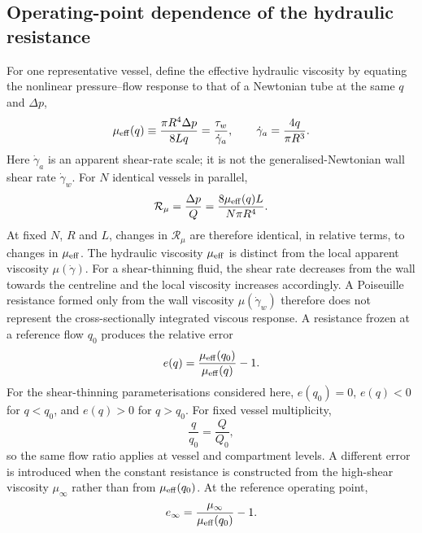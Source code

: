 \documentclass[lineno]{jfm}
\begin{document}
\subsection{Operating-point dependence of the hydraulic resistance}
\label{sec:calibration-point}
For one representative vessel, define the effective hydraulic viscosity by
equating the nonlinear pressure--flow response to that of a Newtonian tube at
the same $q$ and $\Delta p$,
\begin{equation}
\mu_{\rm eff}(q)
\equiv
\frac{\pi R^4\Delta p}{8Lq}
=
\frac{\tau_w}{\dot{\gamma}_a},
\qquad
\dot{\gamma}_a
=
\frac{4q}{\pi R^3}.
\label{eq:mu-eff}
\end{equation}
Here $\dot{\gamma}_a$ is an apparent shear-rate scale; it is not the
generalised-Newtonian wall shear rate $\dot{\gamma}_w$. For $N$ identical
vessels in parallel,
\begin{equation}
\mathcal{R}_{\mu}
=
\frac{\Delta p}{Q}
=
\frac{8\mu_{\rm eff}(q)L}
{N\pi R^4}.
\label{eq:Rmu-poiseuille-form}
\end{equation}
At fixed $N$, $R$ and $L$, changes in $\mathcal{R}_{\mu}$ are therefore
identical, in relative terms, to changes in $\mu_{\rm eff}$.
The hydraulic viscosity $\mu_{\rm eff}$ is distinct from the local apparent
viscosity $\mu(\dot\gamma)$. For a shear-thinning fluid, the shear rate
decreases from the wall towards the centreline and the local viscosity
increases accordingly. A Poiseuille resistance formed only from the wall
viscosity $\mu(\dot\gamma_w)$ therefore does not represent the
cross-sectionally integrated viscous response.
A resistance frozen at a reference flow $q_0$ produces the relative error
\begin{equation}
e(q)
=
\frac{\mu_{\rm eff}(q_0)}
{\mu_{\rm eff}(q)}
-1.
\label{eq:calibration-error}
\end{equation}
For the shear-thinning parameterisations considered here,
$e(q_0)=0$, $e(q)<0$ for $q<q_0$, and $e(q)>0$ for $q>q_0$.
For fixed vessel multiplicity,
\begin{equation}
\frac{q}{q_0}
=
\frac{Q}{Q_0},
\label{eq:qQ-ratio}
\end{equation}
so the same flow ratio applies at vessel and compartment levels.
A different error is introduced when the constant resistance is constructed
from the high-shear viscosity $\mu_\infty$ rather than from
$\mu_{\rm eff}(q_0)$. At the reference operating point,
\begin{equation}
e_\infty
=
\frac{\mu_\infty}
{\mu_{\rm eff}(q_0)}
-1.
\label{eq:high-shear-error}
\end{equation}
\end{document}
